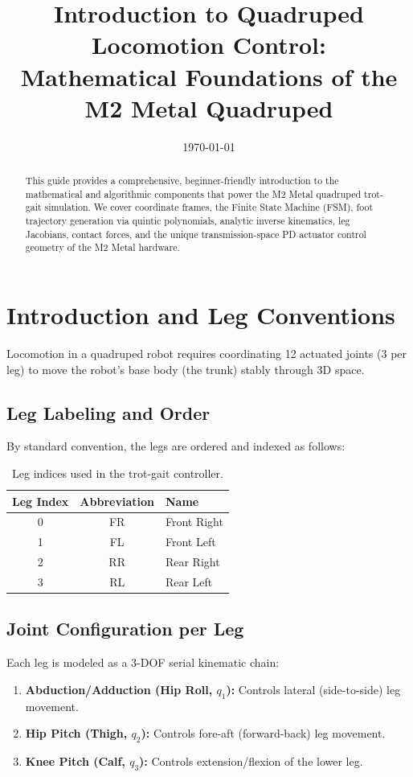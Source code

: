 \documentclass[11pt,a4paper]{article}
\title{\textbf{Introduction to Quadruped Locomotion Control:\\Mathematical Foundations of the M2 Metal Quadruped}}
\date{\today}
\begin{document}
\maketitle

\begin{abstract}
This guide provides a comprehensive, beginner-friendly introduction to the mathematical and algorithmic components that power the M2 Metal quadruped trot-gait simulation. We cover coordinate frames, the Finite State Machine (FSM), foot trajectory generation via quintic polynomials, analytic inverse kinematics, leg Jacobians, contact forces, and the unique transmission-space PD actuator control geometry of the M2 Metal hardware.
\end{abstract}

\tableofcontents
\newpage

\section{Introduction and Leg Conventions}
Locomotion in a quadruped robot requires coordinating 12 actuated joints (3 per leg) to move the robot's base body (the trunk) stably through 3D space. 

\subsection{Leg Labeling and Order}
By standard convention, the legs are ordered and indexed as follows:
\begin{table}[h!]
\centering
\begin{tabular}{ccl}
\toprule
\textbf{Leg Index} & \textbf{Abbreviation} & \textbf{Name} \\
\midrule
0 & FR & Front Right \\
1 & FL & Front Left \\
2 & RR & Rear Right \\
3 & RL & Rear Left \\
\bottomrule
\end{tabular}
\caption{Leg indices used in the trot-gait controller.}
\end{table}

\subsection{Joint Configuration per Leg}
Each leg is modeled as a 3-DOF serial kinematic chain:
\begin{enumerate}
    \item \textbf{Abduction/Adduction (Hip Roll, $q_1$):} Controls lateral (side-to-side) leg movement.
    \item \textbf{Hip Pitch (Thigh, $q_2$):} Controls fore-aft (forward-back) leg movement.
    \item \textbf{Knee Pitch (Calf, $q_3$):} Controls extension/flexion of the lower leg.
\end{enumerate}
\end{document}
